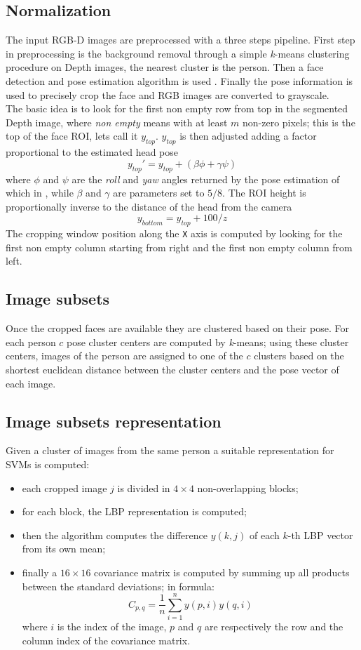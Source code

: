 \documentclass{article}
\begin{document}
\subsection{Normalization}\label{sec:normalization}
The input RGB-D images are preprocessed with a three steps pipeline. First step
in preprocessing is the background removal through a simple \textit{k}-means
clustering procedure on Depth images, the nearest cluster is the person. Then a
face detection and pose estimation algorithm is used \citep{Fanelli2013}.
Finally the pose information is used to precisely crop the face and RGB images
are converted to grayscale. \\
The basic idea is to look for the first non empty row from top in the segmented
Depth image, where \textit{non empty} means with at least $m$ non-zero pixels;
this is the top of the face ROI, lets call it $y_{top}$. $y_{top}$ is then
adjusted adding a factor proportional to the estimated head pose $$y_{top}' =
y_{top} + (\beta \phi +\gamma \psi)$$ where $\phi$ and $\psi$ are the
\textit{roll} and \textit{yaw} angles returned by the pose estimation of which
in \citet{Fanelli2011}, while $\beta$ and $\gamma$ are parameters set to $5/8$.
The ROI height is proportionally inverse to the distance of the head from the
camera $$y_{bottom} = y_{top} + 100/z$$ The cropping window position along the
\verb|X| axis is computed by looking for the first non empty column starting
from right and the first non empty column from left. \\

\subsection{Image subsets}
Once the cropped faces are available they are clustered based on their pose. For each person $c$ pose cluster centers are computed by \textit{k}-means; using these cluster centers, images of the person are assigned to one of the $c$ clusters based on the shortest euclidean distance between the cluster centers and the pose vector of each image.

\subsection{Image subsets representation}
Given a cluster of images from the same person a suitable representation for SVMs is computed:
\begin{itemize}
	\item each cropped image $j$ is divided in $4\times 4$ non-overlapping blocks;
	\item for each block, the LBP representation is computed;
	\item then the algorithm computes the difference $y(k, j)$ of each $k$-th LBP vector from its own mean;
	\item finally a $16\times16$ covariance matrix is computed by summing up all products between the standard deviations; in formula:
		$$C_{p, q} = \frac{1}{n} \sum_{i=1}^n y(p, i)y(q, i)$$
		where $i$ is the index of the image, $p$ and $q$ are respectively the row and the column index of the covariance matrix.
\end{itemize}
\end{document}
